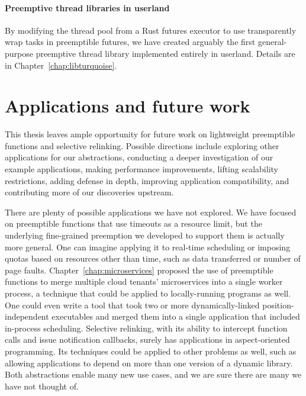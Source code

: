 \paragraph{Preemptive thread libraries in userland}
By modifying the thread pool from a Rust futures executor to use transparently wrap
tasks in preemptible futures, we have created arguably the first general-purpose
preemptive thread library implemented entirely in userland.  Details are in
Chapter~\ref{chap:libturquoise}.


\section{Applications and future work}
\label{sec:thatsawrap:applications}

This thesis leaves ample opportunity for future work on lightweight preemptible
functions and selective relinking.  Possible directions include exploring other
applications for our abstractions, conducting a deeper investigation of our example
applications, making performance improvements, lifting scalability restrictions,
adding defense in depth, improving application compatibility, and contributing more
of our discoveries upstream.

There are plenty of possible applications we have not explored.  We have focused on
preemptible functions that use timeouts as a resource limit, but the underlying
fine-grained preemption we developed to support them is actually more general.  One
can imagine applying it to real-time scheduling or imposing quotas based on resources
other than time, such as data transferred or number of page faults.
Chapter~\ref{chap:microservices} proposed the use of preemptible functions to merge
multiple cloud tenants' microservices into a single worker process, a technique that
could be applied to locally-running programs as well.  One could even write a tool
that took two or more dynamically-linked position-independent executables and merged
them into a single application that included in-process scheduling.  Selective
relinking, with its ability to intercept function calls and issue notification
callbacks, surely has applications in aspect-oriented programming.  Its techniques
could be applied to other problems as well, such as allowing applications to depend
on more than one version of a dynamic library.  Both abstractions enable many new use
cases, and we are sure there are many we have not thought of.

